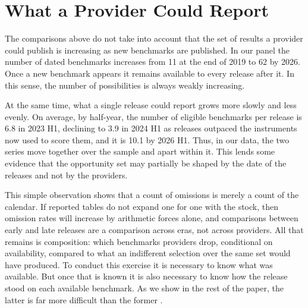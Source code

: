 \section{What a Provider Could Report}\label{sec:opportunity}

The comparisons above do not take into account that the set of results a provider could publish is increasing as new benchmarks are published. In our panel the number of dated benchmarks increases from 11 at the end of 2019 to 62 by 2026. Once a new benchmark appears it remains available to every release after it. In this sense, the number of possibilities is always weakly increasing.

At the same time, what a single release could report grows more slowly and less evenly. On average, by half-year, the number of eligible benchmarks per release is 6.8 in 2023 H1, declining to 3.9 in 2024 H1 as releases outpaced the instruments now used to score them, and it is 10.1 by 2026 H1. Thus, in our data, the two series move together over the sample and apart within it. This lends some evidence that the opportunity set may partially be shaped by the date of the releases and not by the providers.

This simple observation shows that a count of omissions is merely a count of the calendar. If reported tables do not expand one for one with the stock, then omission rates will increase by arithmetic forces alone, and comparisons between early and late releases are a comparison across eras, not across providers. All that remains is composition: which benchmarks providers drop, conditional on availability, compared to what an indifferent selection over the same set would have produced. To conduct this exercise it is necessary to know what was available. But once that is known it is also necessary to know how the release stood on each available benchmark. As we show in the rest of the paper, the latter is far more difficult than the former \citep{dranove2010}.
